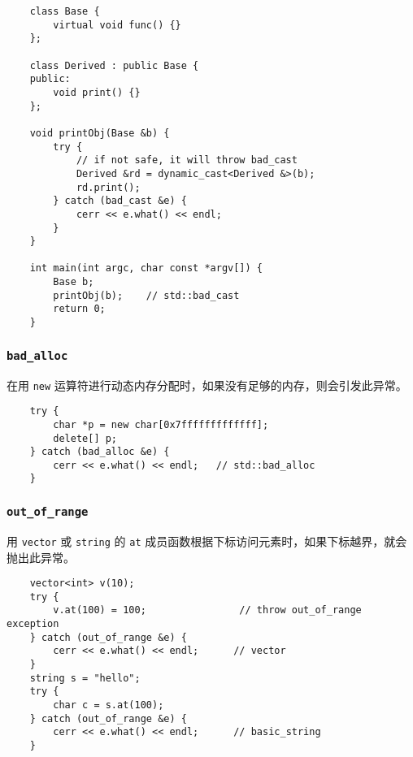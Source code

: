 \documentclass[UTF8]{ctexart}
\begin{document}
\begin{verbatim}
    class Base {
        virtual void func() {}
    };

    class Derived : public Base {
    public:
        void print() {}
    };

    void printObj(Base &b) {
        try {
            // if not safe, it will throw bad_cast
            Derived &rd = dynamic_cast<Derived &>(b);
            rd.print();
        } catch (bad_cast &e) {
            cerr << e.what() << endl;
        }
    }

    int main(int argc, char const *argv[]) {
        Base b;
        printObj(b);    // std::bad_cast
        return 0;
    }
\end{verbatim}

\subsubsection{\texttt{bad\_alloc}}
在用 \texttt{new} 运算符进行动态内存分配时，如果没有足够的内存，则会引发此异常。

\begin{verbatim}
    try {
        char *p = new char[0x7fffffffffffff];
        delete[] p;
    } catch (bad_alloc &e) {
        cerr << e.what() << endl;   // std::bad_alloc
    }
\end{verbatim}

\subsubsection{\texttt{out\_of\_range}}
用 \texttt{vector} 或 \texttt{string} 的 \texttt{at} 成员函数根据下标访问元素时，如果下标越界，就会抛出此异常。

\begin{verbatim}
    vector<int> v(10);
    try {
        v.at(100) = 100;                // throw out_of_range exception
    } catch (out_of_range &e) {
        cerr << e.what() << endl;      // vector
    }
    string s = "hello";
    try {
        char c = s.at(100);
    } catch (out_of_range &e) {
        cerr << e.what() << endl;      // basic_string
    }
\end{verbatim}
\end{document}
